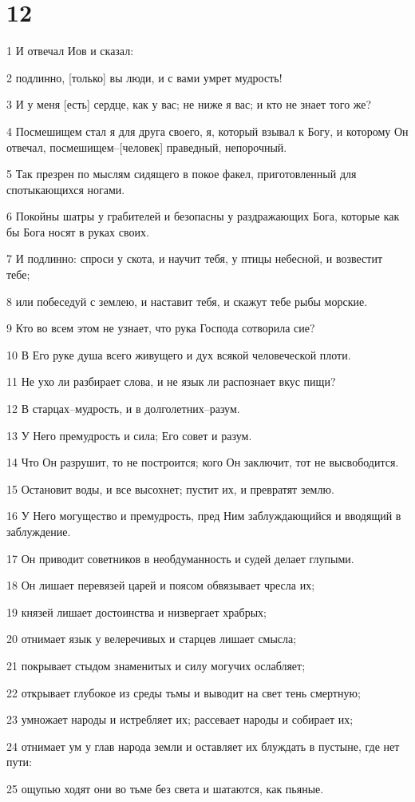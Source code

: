 \chapter{12}

\par 1 И отвечал Иов и сказал:
\par 2 подлинно, [только] вы люди, и с вами умрет мудрость!
\par 3 И у меня [есть] сердце, как у вас; не ниже я вас; и кто не знает того же?
\par 4 Посмешищем стал я для друга своего, я, который взывал к Богу, и которому Он отвечал, посмешищем--[человек] праведный, непорочный.
\par 5 Так презрен по мыслям сидящего в покое факел, приготовленный для спотыкающихся ногами.
\par 6 Покойны шатры у грабителей и безопасны у раздражающих Бога, которые как бы Бога носят в руках своих.
\par 7 И подлинно: спроси у скота, и научит тебя, у птицы небесной, и возвестит тебе;
\par 8 или побеседуй с землею, и наставит тебя, и скажут тебе рыбы морские.
\par 9 Кто во всем этом не узнает, что рука Господа сотворила сие?
\par 10 В Его руке душа всего живущего и дух всякой человеческой плоти.
\par 11 Не ухо ли разбирает слова, и не язык ли распознает вкус пищи?
\par 12 В старцах--мудрость, и в долголетних--разум.
\par 13 У Него премудрость и сила; Его совет и разум.
\par 14 Что Он разрушит, то не построится; кого Он заключит, тот не высвободится.
\par 15 Остановит воды, и все высохнет; пустит их, и превратят землю.
\par 16 У Него могущество и премудрость, пред Ним заблуждающийся и вводящий в заблуждение.
\par 17 Он приводит советников в необдуманность и судей делает глупыми.
\par 18 Он лишает перевязей царей и поясом обвязывает чресла их;
\par 19 князей лишает достоинства и низвергает храбрых;
\par 20 отнимает язык у велеречивых и старцев лишает смысла;
\par 21 покрывает стыдом знаменитых и силу могучих ослабляет;
\par 22 открывает глубокое из среды тьмы и выводит на свет тень смертную;
\par 23 умножает народы и истребляет их; рассевает народы и собирает их;
\par 24 отнимает ум у глав народа земли и оставляет их блуждать в пустыне, где нет пути:
\par 25 ощупью ходят они во тьме без света и шатаются, как пьяные.

